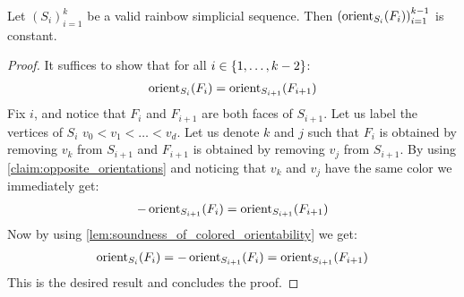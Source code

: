 \begin{lemma}
	\label{lem:consistent_orientation_of_transition_faces}
	Let $\left(S_i\right)_{i=1}^{k}$ be a valid rainbow simplicial sequence. Then $\left(\operatorname{orient}_{S_i}(F_i)\right)_{i=1}^{k-1}$ is constant.
\end{lemma}

\begin{proof}
	It suffices to show that for all $i \in \left\{1, \dots, k-2\right\}$:
	\begin{align*}
		\operatorname{orient}_{S_i}(F_i) =  \operatorname{orient}_{S_{i+1}}(F_{i+1})
	\end{align*}
	Fix $i$, and notice that $F_i$ and $F_{i+1}$ are both faces of $S_{i+1}$. Let us label the vertices of $S_i$ $v_0 < v_1 < \dots < v_d$. Let us denote $k$ and $j$ such that $F_i$ is obtained by removing $v_k$ from $S_{i+1}$ and $F_{i+1}$ is obtained by removing $v_j$ from $S_{i+1}$.
	By using \cref{claim:opposite_orientations} and noticing that $v_k$ and $v_j$ have the same color  we immediately get:
	\begin{align*}
		- \operatorname{orient}_{S_{i+1}}(F_i) =  \operatorname{orient}_{S_{i+1}}(F_{i+1})
	\end{align*}
	Now by using \cref{lem:soundness_of_colored_orientability} we get:
	\begin{align*}
		\operatorname{orient}_{S_i}(F_i) = - \operatorname{orient}_{S_{i+1}}(F_i) =  \operatorname{orient}_{S_{i+1}}(F_{i+1})
	\end{align*}
	This is the desired result and concludes the proof.
\end{proof}

